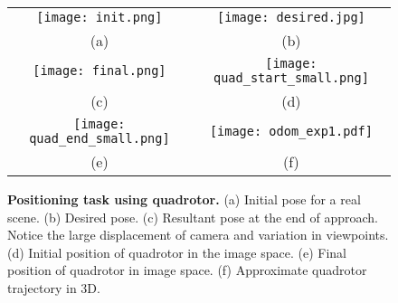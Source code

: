 \documentclass[usletter, 10 pt, conference]{ieeeconf}  %
\begin{document}
\begin{figure}[h!]
\begin{center}
\begin{tabular}{cc}
\texttt{[image: init.png]} &
\texttt{[image: desired.jpg]} \\
(a) & (b) \\
\texttt{[image: final.png]} &
\texttt{[image: quad\_start\_small.png]} \\
(c) & (d) \\
\texttt{[image: quad\_end\_small.png]} & 
\texttt{[image: odom\_exp1.pdf]}
\\
(e) & (f)
\end{tabular}
\end{center}
\caption{\textbf{Positioning task using quadrotor.} (a) Initial pose for a real scene. (b) Desired pose. (c) Resultant pose at the end of approach. Notice the large displacement of camera and variation in viewpoints. (d) Initial position of quadrotor in the image space. (e) Final position of quadrotor in image space. (f) Approximate quadrotor trajectory in 3D.}
\label{fig:quad}
\vspace{-0.50em}
\end{figure}
\end{document}
